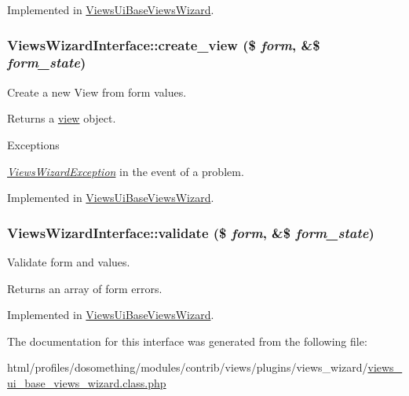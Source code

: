 Implemented in \hyperlink{classViewsUiBaseViewsWizard_aca015cf9fee6dd3ee556b18405f4dfe4}{ViewsUiBaseViewsWizard}.\hypertarget{interfaceViewsWizardInterface_a29dcb9af9b511509bba69e55b643edc0}{
\subsubsection[{create\_\-view}]{\setlength{\rightskip}{0pt plus 5cm}ViewsWizardInterface::create\_\-view (\$ {\em form}, \/  \&\$ {\em form\_\-state})}}
\label{interfaceViewsWizardInterface_a29dcb9af9b511509bba69e55b643edc0}
Create a new View from form values.

\begin{DoxyReturn}{Returns}
a \hyperlink{classview}{view} object.
\end{DoxyReturn}

\begin{DoxyExceptions}{Exceptions}
\item[{\em \hyperlink{classViewsWizardException}{ViewsWizardException}}]in the event of a problem. \end{DoxyExceptions}


Implemented in \hyperlink{classViewsUiBaseViewsWizard_aef86de986b8438fc1b301d8413e69f00}{ViewsUiBaseViewsWizard}.\hypertarget{interfaceViewsWizardInterface_af5be7d965ec92b27da1eb1a01f5bfc61}{
\subsubsection[{validate}]{\setlength{\rightskip}{0pt plus 5cm}ViewsWizardInterface::validate (\$ {\em form}, \/  \&\$ {\em form\_\-state})}}
\label{interfaceViewsWizardInterface_af5be7d965ec92b27da1eb1a01f5bfc61}
Validate form and values.

\begin{DoxyReturn}{Returns}
an array of form errors. 
\end{DoxyReturn}


Implemented in \hyperlink{classViewsUiBaseViewsWizard_a894ab06673721a26809f0a662241641b}{ViewsUiBaseViewsWizard}.

The documentation for this interface was generated from the following file:\begin{DoxyCompactItemize}
\item 
html/profiles/dosomething/modules/contrib/views/plugins/views\_\-wizard/\hyperlink{views__ui__base__views__wizard_8class_8php}{views\_\-ui\_\-base\_\-views\_\-wizard.class.php}\end{DoxyCompactItemize}
